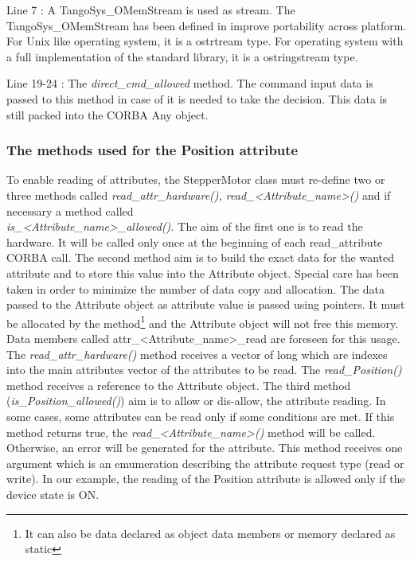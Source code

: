 Line 7 : A TangoSys\_OMemStream is used as stream. The TangoSys\_OMemStream
has been defined in improve portability across platform. For Unix
like operating system, it is a ostrtream type. For operating system
with a full implementation of the standard library, it is a ostringstream
type.

Line 19-24 : The \emph{direct\_cmd\_allowed} method. The command input
data is passed to this method in case of it is needed to take the
decision. This data is still packed into the CORBA Any object.

\subsubsection{The methods used for the Position attribute}

To enable reading of attributes, the StepperMotor
class must re-define two or three methods called \emph{read\_attr\_hardware(),
read\_<Attribute\_name>()} and if necessary
a method called \\
\emph{is\_<Attribute\_name>\_allowed().} The aim of the first one
is to read the hardware. It will be called only once at the beginning
of each read\_attribute CORBA call. The second method aim is to build
the exact data for the wanted attribute and to store this value into
the Attribute object. Special care has been taken in order to minimize
the number of data copy and allocation. The data passed to the Attribute
object as attribute value is passed using pointers. It must be allocated
by the method\footnote{It can also be data declared as object data members or memory declared
as static} and the Attribute object will not free this memory.
Data members called attr\_<Attribute\_name>\_read are foreseen for
this usage. The \emph{read\_attr\_hardware()} method receives a vector
of long which are indexes into the main attributes vector of the attributes
to be read. The \emph{read\_Position()} method receives a reference
to the Attribute object. The third method (\emph{is\_Position\_allowed()})
aim is to allow or dis-allow, the attribute reading. In some cases,
some attributes can be read only if some conditions are met. If this
method returns true, the \emph{read\_<Attribute\_name>()} method will
be called. Otherwise, an error will be generated for the attribute.
This method receives one argument which is an emumeration describing
the attribute request type (read or write). In our example, the reading
of the Position attribute is allowed only if the device state is ON.


